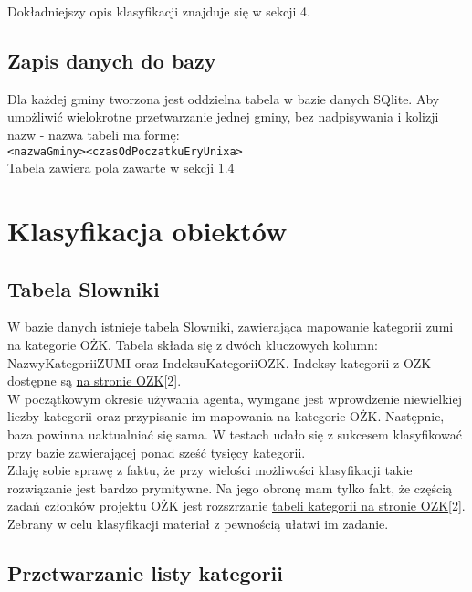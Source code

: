 \documentclass[a4 122pt]{article}
\begin{document}
			Dokładniejszy opis klasyfikacji znajduje się w sekcji 4.
			
		\subsection{Zapis danych do bazy}
			
			Dla każdej gminy tworzona jest oddzielna tabela w bazie danych SQlite.
			Aby umożliwić wielokrotne przetwarzanie jednej gminy, bez nadpisywania i kolizji nazw - nazwa tabeli ma formę:\\
			
			\texttt{<nazwaGminy><czasOdPoczatkuEryUnixa>}\\
			
			Tabela zawiera pola zawarte w sekcji 1.4
	
	\section{Klasyfikacja obiektów}
				
			\subsection{Tabela Slowniki}
			
				W bazie danych istnieje tabela Slowniki, zawierająca mapowanie kategorii zumi na kategorie OŻK.
				Tabela składa się z dwóch kluczowych kolumn: NazwyKategoriiZUMI oraz IndeksuKategoriiOZK.
				Indeksy kategorii z OZK dostępne są \href{http://ozkultura.pl/node/1800}{na stronie OZK}[2].\\
			
				\noindent W początkowym okresie używania agenta, wymgane jest wprowdzenie niewielkiej liczby kategorii oraz przypisanie im mapowania na kategorie OŻK.
				Następnie, baza powinna uaktualniać się sama. W testach udało się z sukcesem klasyfikować przy bazie zawierającej ponad sześć tysięcy kategorii.\\
				
				\noindent Zdaję sobie sprawę z faktu, że przy wielości możliwości klasyfikacji takie rozwiązanie jest bardzo prymitywne. 
				Na jego obronę mam tylko fakt, że częścią zadań członków projektu OŻK jest rozszrzanie \href{http://ozkultura.pl/node/1800}{tabeli kategorii na stronie OZK}[2].
				Zebrany w celu klasyfikacji materiał z pewnością ułatwi im zadanie.
				
			\subsection{Przetwarzanie listy kategorii}
			
\end{document}

